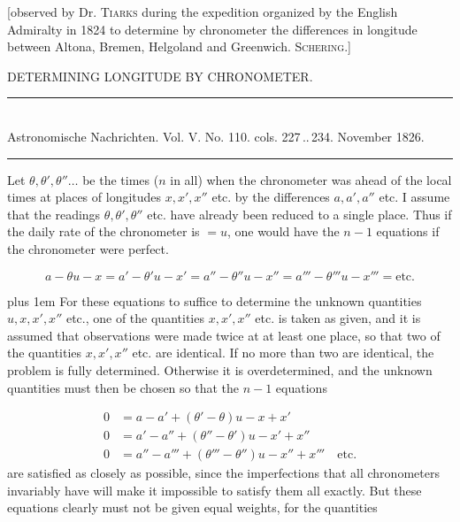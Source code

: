 \clearpage
{}
\hypertarget{native-460-chronometric}{}
\expandafter\def\csname HistoricalNoteText462\endcsname{[observed by Dr. \textsc{Tiarks} during the expedition organized by the English Admiralty in 1824 to determine by chronometer the differences in longitude between Altona, Bremen, Helgoland and Greenwich. \textsc{Schering}.]}
\begin{center}{\large DETERMINING LONGITUDE BY CHRONOMETER.}\end{center}

\begin{center}
\rule{0.55\linewidth}{0.4pt}\\[2pt]
Astronomische Nachrichten. Vol. V. No. 110. cols. 227\,..\,234. November 1826.\\[2pt]
\rule{0.55\linewidth}{0.4pt}
\end{center}

Let $\theta, \theta', \theta''\ldots$ be the times ($n$ in all) when the chronometer was ahead of the local times at places of longitudes $x, x', x''$ etc. by the differences $a, a', a''$ etc. I assume that the readings $\theta, \theta', \theta''$ etc. have already been reduced to a single place. Thus if the daily rate of the chronometer is $=u$, one would have the $n-1$ equations if the chronometer were perfect.

\[
a-\theta u-x = a'-\theta' u-x' = a''-\theta'' u-x'' = a'''-\theta''' u-x''' = \text{etc.}
\]

\begingroup\rightskip=0pt plus 1em
For these equations to suffice to determine the unknown quantities $u, x, x', x''$ etc., one of the quantities $x, x', x''$ etc. is taken as given, and it is assumed that observations were made twice at at least one place, so that two of the quantities $x, x', x''$ etc. are identical. If no more than two are identical, the problem is fully determined. Otherwise it is overdetermined, and the unknown quantities must then be chosen so that the $n-1$ equations\par\endgroup

\[
\begin{aligned}
0 &= a-a'+(\theta'-\theta)u-x+x'\\
0 &= a'-a''+(\theta''-\theta')u-x'+x''\\
0 &= a''-a'''+(\theta'''-\theta'')u-x''+x''' \quad \text{etc.}
\end{aligned}
\]
\noindent are satisfied as closely as possible, since the imperfections that all chronometers invariably have will make it impossible to satisfy them all exactly. But these equations clearly must not be given equal weights, for the quantities

